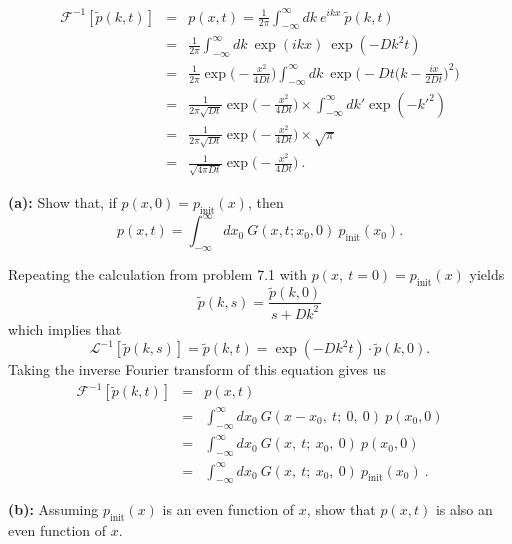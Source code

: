 \begin{eqnarray}
\mathcal{F}^{-1} [\tilde{p}(k, t)] &=& p(x,t)  = \frac{1}{2 \pi } \int_{-\infty}^{\infty} dk~e^{i k x}~\tilde{p}(k, t)  \nonumber \\
&=& \frac{1}{2 \pi } \int_{-\infty}^{\infty} dk~\exp(i k x)~ \exp(-D k^2 t) \nonumber  \\
&=& \frac{1}{2 \pi } \exp\bigg(- \frac{x^2}{4 D t} \bigg) \int_{-\infty}^{\infty} dk~\exp \Bigg(-D t \bigg(k-\frac{i x}{2 D t}\bigg) ^2\Bigg) \nonumber \\
&=& \frac{1}{2 \pi \sqrt{D t} } \exp\bigg(- \frac{x^2}{4 D t} \bigg) \times \int_{-\infty}^{\infty} dk' \exp (-k'^2 ) \nonumber \\
&=& \frac{1}{2 \pi \sqrt{D t} } \exp\bigg(- \frac{x^2}{4 D t} \bigg) \times \sqrt{\pi} \nonumber \\
&=& \boxed{\frac{1}{\sqrt{4 \pi D t} } \exp\bigg(- \frac{x^2}{4 D t}\bigg)}~.
\end{eqnarray}

\textbf{(a):} Show that, if $p(x,0)=p_\text{init}(x)$, then
\begin{equation}
p(x,t) = \int_{-\infty}^{\infty} dx_0~G(x, t; x_0, 0)~p_\text{init}(x_0).
\end{equation}

Repeating the calculation from problem 7.1 with $p(x,~t=0) = p_\text{init}(x)$ yields
\begin{equation}
\tilde{p}(k, s)  = \frac{\tilde{p}(k, 0)}{s + D k^2}
\end{equation}
which implies that 
\begin{equation}
\mathcal{L}^{-1} [\tilde{p}(k, s)] = \tilde{p}(k, t) = \exp(-D k^2 t) \cdot \tilde{p}(k, 0).
\end{equation}
Taking the inverse Fourier transform of this equation gives us
\begin{eqnarray}
\mathcal{F}^{-1} [\tilde{p}(k, t)] &=& p(x,t) \nonumber \\
&=& \int_{-\infty}^{\infty} dx_0~ G(x-x_0,~t;~0,~0)~p(x_0,0) \nonumber \\
&=& \int_{-\infty}^{\infty} dx_0~ G(x,~t;~x_0,~0)~p(x_0,0) \nonumber \\
&=& \boxed{\int_{-\infty}^{\infty} dx_0~G(x,~t;~x_0,~0)~p_\text{init}(x_0)}~.
\end{eqnarray}

\textbf{(b):} Assuming $p_\text{init}(x)$ is an even function of $x$, show that $p(x,t)$ is also an even function of $x$.

